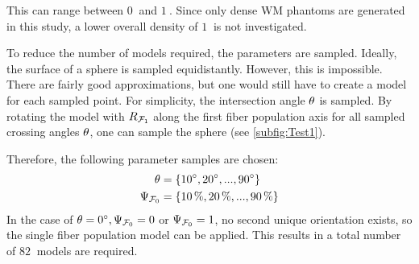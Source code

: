 This can range between $\SI{0}{}$ and $\SI{1}{}$.
Since only dense \ac{WM} phantoms are generated in this study, a lower overall density of $\SI{1}{}$ is not investigated.
\par
%
To reduce the number of models required, the parameters are sampled.
Ideally, the surface of a sphere is sampled equidistantly.
However, this is impossible.
There are fairly good approximations, but one would still have to create a model for each sampled point.
For simplicity, the intersection angle $\textnormal{$\theta$}$ is sampled.
By rotating the model with $\textnormal{$R_{\textnormal{$\mathcal{F}_1$}}$}$ along the first fiber population axis for all sampled crossing angles $\textnormal{$\theta$}$, one can sample the sphere (see \cref{subfig:Test1}).
\par
% 
Therefore, the following parameter samples are chosen:
% 
\begin{align}
    \begin{split}
        \textnormal{$\theta$} &= \{\SI{10}{\degree}, \SI{20}{\degree}, ..., \SI{90}{\degree}\}\\
        \textnormal{$\Psi_{\textnormal{$\mathcal{F}_0$}}$} &= \{\SI{10}{\percent}, \SI{20}{\percent}, ..., \SI{90}{\percent}\}
    \end{split}
\end{align}
% 
In the case of $\textnormal{$\theta$} = \SI{0}{\degree}, \textnormal{$\Psi_{\textnormal{$\mathcal{F}_0$}}$} = 0$ or $\textnormal{$\Psi_{\textnormal{$\mathcal{F}_0$}}$} = 1$, no second unique orientation exists, so the single fiber population model can be applied.
This results in a total number of $\SI{82}{}$ models are required.
%
% 
% 
